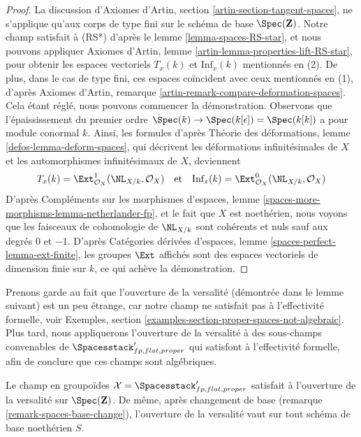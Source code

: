 \begin{proof}
La discussion d'Axiomes d'Artin, section \ref{artin-section-tangent-spaces},
ne s'applique qu'aux corps de type fini sur le schéma de base
$\Spec(\mathbf{Z})$.
Notre champ satisfait à (RS*) d'après le lemme \ref{lemma-spaces-RS-star},
et nous pouvons appliquer
Axiomes d'Artin, lemme \ref{artin-lemma-properties-lift-RS-star},
pour obtenir les espaces vectoriels $T_x(k)$ et $\text{Inf}_x(k)$ mentionnés en
(2). De plus, dans le cas de type fini, ces espaces coïncident avec ceux
mentionnés en (1), d'après Axiomes d'Artin, remarque
\ref{artin-remark-compare-deformation-spaces}.
Cela étant réglé, nous pouvons commencer la démonstration.
Observons que l'épaississement du premier ordre
$\Spec(k) \to \Spec(k[\epsilon]) = \Spec(k[k])$
a pour module conormal $k$. Ainsi, les formules d'après
Théorie des déformations, lemme \ref{defos-lemma-deform-spaces},
qui décrivent les déformations infinitésimales de $X$ et les automorphismes
infinitésimaux de $X$, deviennent
$$
T_x(k) = \Ext^1_{\mathcal{O}_X}(\NL_{X/k}, \mathcal{O}_X)
\quad\text{et}\quad
\text{Inf}_x(k) = \Ext^0_{\mathcal{O}_X}(\NL_{X/k}, \mathcal{O}_X)
$$
D'après Compléments sur les morphismes d'espaces, lemme
\ref{spaces-more-morphisms-lemma-netherlander-fp}, et le fait que $X$ est
noethérien, nous voyons que les faisceaux de cohomologie de $\NL_{X/k}$ sont
cohérents et nuls sauf aux degrés $0$ et $-1$.
D'après Catégories dérivées d'espaces, lemme
\ref{spaces-perfect-lemma-ext-finite}, les groupes $\Ext$ affichés sont des
espaces vectoriels de dimension finie sur $k$, ce qui achève la démonstration.
\end{proof}

\noindent
Prenons garde au fait que l'ouverture de la versalité (démontrée dans le lemme
suivant) est un peu étrange, car notre champ ne satisfait pas à l'effectivité
formelle, voir Exemples, section
\ref{examples-section-proper-spaces-not-algebraic}.
Plus tard, nous appliquerons l'ouverture de la versalité à des sous-champs
convenables de $\Spacesstack'_{fp, flat, proper}$ qui satisfont à l'effectivité
formelle, afin de conclure que ces champs sont algébriques.

\begin{lemma}
\label{lemma-spaces-defo-thy}
Le champ en groupoïdes
$\mathcal{X} = \Spacesstack'_{fp, flat, proper}$ satisfait à l'ouverture de la
versalité sur $\Spec(\mathbf{Z})$.
De même, après changement de base (remarque \ref{remark-spaces-base-change}),
l'ouverture de la versalité vaut sur tout schéma de base noethérien $S$.
\end{lemma}

